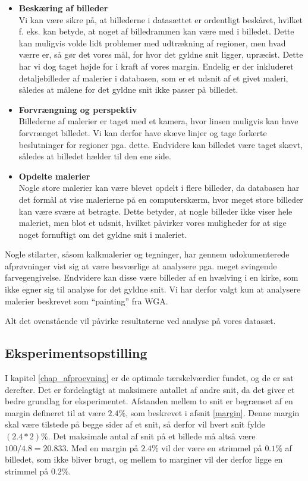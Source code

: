 {\begin{itemize}
    \item \textbf{Beskæring af billeder}\\
        Vi kan være sikre på, at billederne i datasættet er ordentligt
        beskåret, hvilket f. eks. kan betyde, at noget af billedrammen
        kan være med i billedet. Dette kan muligvis volde lidt problemer
        med udtrækning af regioner, men hvad værre er, så gør det vores
        mål, for hvor det gyldne snit ligger, upræcist.  Dette har vi
        dog taget højde for i kraft af vores margin.  Endelig er der
        inkluderet detaljebilleder af malerier i databasen, som er et
        udsnit af et givet maleri, således at målene for det gyldne snit
        ikke passer på billedet.
    \item \textbf{Forvrængning og perspektiv}\\
        Billederne af malerier er taget med et kamera, hvor linsen
        muligvis kan have forvrænget billedet. Vi kan derfor have skæve
        linjer og tage forkerte beslutninger for regioner pga. dette.
        Endvidere kan billedet være taget skævt, således at billedet
        hælder til den ene side.
    \item \textbf{Opdelte malerier}\\
        Nogle store malerier kan være blevet opdelt i flere billeder, da
        databasen har det formål at vise malerierne på en computerskærm,
        hvor meget store billeder kan være svære at betragte. Dette
        betyder, at nogle billeder ikke viser hele maleriet, men blot
        et udsnit, hvilket påvirker vores muligheder for at sige noget
        fornuftigt om det gyldne snit i maleriet.
\end{itemize}

Nogle stilarter, såsom kalkmalerier og tegninger, har gennem
udokumenterede afprøvninger vist sig at være besværlige at analysere
pga. meget svingende farvegengivelse. Endvidere kan disse være billeder
af en hvælving i en kirke, som ikke egner sig til analyse for det gyldne
snit. Vi har derfor valgt kun at analysere malerier beskrevet som
``painting'' fra WGA.

Alt det ovenstående vil påvirke resultaterne ved analyse på vores
datasæt.

\subsection{Eksperimentsopstilling}
I kapitel \ref{chap_afproevning} er de optimale tærskelværdier fundet, og
de er sat derefter.  Det er fordelagtigt at maksimere antallet af andre
snit, da det giver et bedre grundlag for eksperimentet.  Afstanden
mellem to snit er begrænset af en margin defineret til at være $2.4\%$,
som beskrevet i afsnit \ref{margin}.  Denne margin skal være tilstede
på begge sider af et snit, så derfor vil hvert snit fylde $(2.4*2)\%$.
Det maksimale antal af snit på et billede må altså være
$100/4.8=20.833$.  Med en margin på $2.4\%$ vil der være en strimmel på
$0.1\%$ af billedet, som ikke bliver brugt, og mellem to marginer vil
der derfor ligge en strimmel på $0.2\%$.

}
